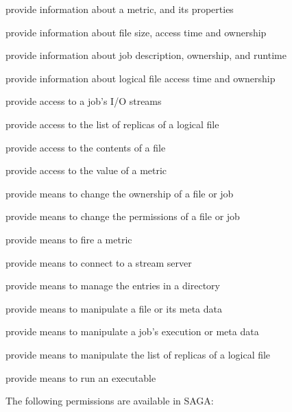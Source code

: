   \begin{shortlist}
   \item provide information about a metric, and its properties
   \item provide information about file size, access time and ownership
   \item provide information about job description, ownership, and runtime
   \item provide information about logical file access time and ownership
   \item provide access to a job's I/O streams
   \item provide access to the list of replicas of a logical file
   \item provide access to the contents of a file
   \item provide access to the value of a metric
   \item provide means to change the ownership of a file or job
   \item provide means to change the permissions of a file or job
   \item provide means to fire a metric
   \item provide means to connect to a stream server
   \item provide means to manage the entries in a directory
   \item provide means to manipulate a file or its meta data
   \item provide means to manipulate a job's execution or meta data 
   \item provide means to manipulate the list of replicas of a logical file
   \item provide means to run an executable
  \end{shortlist}
 
 The following permissions are available in SAGA:
 
